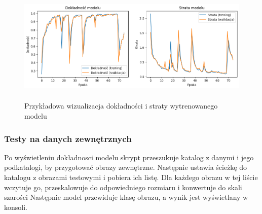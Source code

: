 \begin{figure}[ht]
	\centering
	\includegraphics[height=5.5cm]{resources/model/images/v2_epoch75.png}
	\caption{Przykładowa wizualizacja dokładności i straty wytrenowanego modelu}
	\label{Fig:tests-wyniki-1}
\end{figure}
\FloatBarrier

\subsubsection{Testy na danych zewnętrznych}
Po wyświetleniu dokładnosci modelu skrypt przeszukuje katalog z danymi i jego podkatalogi, by przygotować obrazy zewnętrzne.
Następnie ustawia ścieżkę do katalogu z obrazami testowymi i pobiera ich listę.
Dla każdego obrazu w tej liście wczytuje go, przeskalowuje do odpowiedniego rozmiaru i konwertuje do skali szarości
Następnie model przewiduje klasę obrazu, a wynik jest wyświetlany w konsoli.